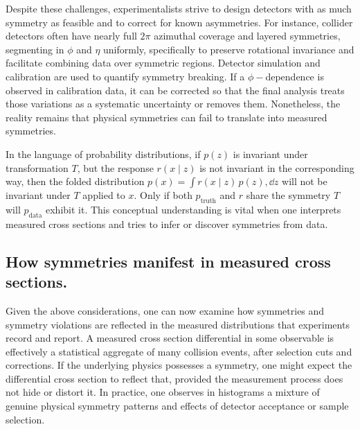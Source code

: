         Despite these challenges, experimentalists strive to design detectors with as much symmetry as feasible and to correct for known asymmetries.
        For instance, collider detectors often have nearly full $2\pi$ azimuthal coverage and layered symmetries, segmenting in $\phi$ and $\eta$ uniformly, specifically to preserve rotational invariance and facilitate combining data over symmetric regions.
        Detector simulation and calibration are used to quantify symmetry breaking.
        If a $\phi-$dependence is observed in calibration data, it can be corrected so that the final analysis treats those variations as a systematic uncertainty or removes them.
        Nonetheless, the reality remains that physical symmetries can fail to translate into measured symmetries.

        In the language of probability distributions, if $p(z)$ is invariant under transformation $T$, but the response $r(x\mid z)$ is not invariant in the corresponding way, then the folded distribution $p(x) = \int r(x\mid z)\,p(z),\dd z$ will not be invariant under $T$ applied to $x$.
        Only if both $p_{\text{truth}}$ and $r$ share the symmetry $T$ will $p_{\text{data}}$ exhibit it.
        This conceptual understanding is vital when one interprets measured cross sections and tries to infer or discover symmetries from data.

    \subsection{How symmetries manifest in measured cross sections.}
    \label{subsec:cross-section-symmetries}
        Given the above considerations, one can now examine how symmetries and symmetry violations are reflected in the measured distributions that experiments record and report.
        A measured cross section differential in some observable is effectively a statistical aggregate of many collision events, after selection cuts and corrections.
        If the underlying physics possesses a symmetry, one might expect the differential cross section to reflect that, provided the measurement process does not hide or distort it.
        In practice, one observes in histograms a mixture of genuine physical symmetry patterns and effects of detector acceptance or sample selection.

